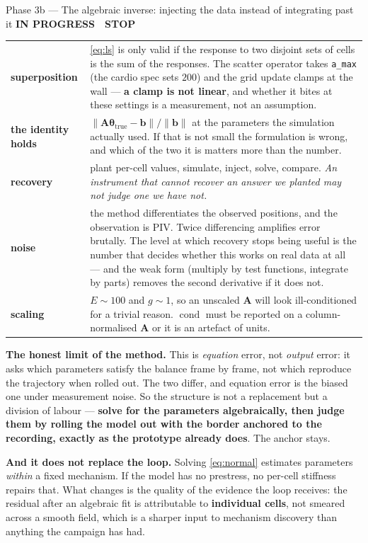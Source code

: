 \documentclass[11pt,a4paper]{article}
\newcommand{\code}[1]{\texttt{#1}}
\newcommand{\Mat}[1]{\mathbf{#1}}
\newcommand{\A}{\Mat{A}}
\newcommand{\thet}{\boldsymbol{\theta}}
\DeclareMathOperator{\cond}{cond}
\newcommand{\prog}{\textcolor{warn}{\textbf{IN PROGRESS}}}
\newcommand{\stopp}{\textcolor{bad!30!white}{\textbf{STOP}}}
\begin{document}
\begin{phasebox}{Phase 3b --- The algebraic inverse: injecting the data instead of integrating past it \hfill \prog\ \ \stopp}
\begin{center}\footnotesize
\begin{tabular}{@{}l p{9.8cm}@{}}
\toprule
\textbf{superposition} & \eqref{eq:ls} is only valid if the response to two disjoint sets of cells
is the sum of the responses. The scatter operator takes \code{a\_max} (the cardio spec sets $200$)
and the grid update clamps at the wall --- \textbf{a clamp is not linear}, and whether it bites at
these settings is a measurement, not an assumption.\\
\addlinespace
\textbf{the identity holds} & $\|\A\thet_{\text{true}} - \Mat b\| / \|\Mat b\|$ at the parameters
the simulation actually used. If that is not small the formulation is wrong, and which of the two
it is matters more than the number.\\
\addlinespace
\textbf{recovery} & plant per-cell values, simulate, inject, solve, compare. \emph{An instrument
that cannot recover an answer we planted may not judge one we have not.}\\
\addlinespace
\textbf{noise} & the method differentiates the observed positions, and the observation is PIV. Twice
differencing amplifies error brutally. The level at which recovery stops being useful is the number
that decides whether this works on real data at all --- and the weak form (multiply by test
functions, integrate by parts) removes the second derivative if it does not.\\
\addlinespace
\textbf{scaling} & $E \sim 100$ and $g \sim 1$, so an unscaled $\A$ will look ill-conditioned for a
trivial reason. $\cond$ must be reported on a column-normalised $\A$ or it is an artefact of units.\\
\bottomrule
\end{tabular}
\end{center}

\textbf{The honest limit of the method.} This is \emph{equation} error, not \emph{output} error: it
asks which parameters satisfy the balance frame by frame, not which reproduce the trajectory when
rolled out. The two differ, and equation error is the biased one under measurement noise. So the
structure is not a replacement but a division of labour --- \textbf{solve for the parameters
algebraically, then judge them by rolling the model out with the border anchored to the recording,
exactly as the prototype already does}. The anchor stays.

\textbf{And it does not replace the loop.} Solving \eqref{eq:normal} estimates parameters
\emph{within} a fixed mechanism. If the model has no prestress, no per-cell stiffness repairs that.
What changes is the quality of the evidence the loop receives: the residual after an algebraic fit
is attributable to \textbf{individual cells}, not smeared across a smooth field, which is a sharper
input to mechanism discovery than anything the campaign has had.


\end{phasebox}
\end{document}
